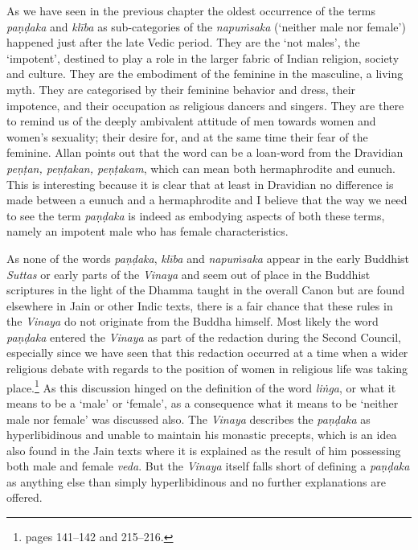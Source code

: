 As we have seen in the previous chapter the oldest occurrence of the terms {\em paṇḍaka} and {\em klība} as sub-categories of the {\em napuṁsaka} (`neither male nor female') happened just after the late Vedic period. They are the `not males', the `impotent', destined to play a role in the larger fabric of Indian religion, society and culture. They are the embodiment of the feminine in the masculine, a living myth. They are categorised by their feminine behavior and dress, their impotence, and their occupation as religious dancers and singers. They are there to remind us of the deeply ambivalent attitude of men towards women and women's sexuality; their desire for, and at the same time their fear of the feminine. Allan \cite{bomhard} points out that the word can be a loan-word from the Dravidian {\em peṇṭan, peṇṭakan, peṇṭakam}, which can mean both hermaphrodite and eunuch. This is interesting because it is clear that at least in Dravidian no difference is made between a eunuch and a hermaphrodite and I believe that the way we need to see the term {\em paṇḍaka} is indeed as embodying aspects of both these terms, namely an impotent male who has female characteristics.

As none of the words {\em paṇḍaka}, {\em klība} and {\em napuṁsaka} appear in the early Buddhist {\em Suttas} or early parts of the {\em Vinaya} and seem out of place in the Buddhist scriptures in the light of the Dhamma taught in the overall Canon but are found elsewhere in Jain or other Indic texts, there is a fair chance that these rules in the {\em Vinaya} do not originate from the Buddha himself. Most likely the word {\em paṇḍaka} entered the {\em Vinaya} as part of the redaction during the Second Council, especially since we have seen that this redaction occurred at a time when a wider religious debate with regards to the position of women in religious life was taking place.\footnote{\cite{sujato2009} pages 141–142 and 215–216.} As this discussion hinged on the definition of the word {\em liṅga}, or what it means to be a `male' or `female', as a consequence what it means to be `neither male nor female' was discussed also. The {\em Vinaya} describes the {\em paṇḍaka} as hyperlibidinous and unable to maintain his monastic precepts, which is an idea also found in the Jain texts where it is explained as the result of him possessing both male and female {\em veda}. But the {\em Vinaya} itself falls short of defining a {\em paṇḍaka} as anything else than simply hyperlibidinous and no further explanations are offered. 

